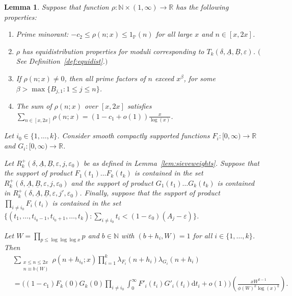 \documentclass{amsart}
\newtheorem{lemma}{Lemma}
\numberwithin{equation}{section}
\begin{document}
 \begin{lemma}\label{lem:asymptotics}  Suppose that function $\rho: \mathbb{N} \times (1,\infty) \rightarrow \mathbb{R}$ has the following properties:
\begin{enumerate}[{\rm(1)}]
\item Prime minorant: $-c_2 \leq \rho(n;x) \leq 1_{\mathbb{P}}(n)$ for all large $x$ and $n \in [x,2x]$.  
\item  $\rho$ has  equidistribution properties for  moduli corresponding to $T_k(\delta,\underline{A},\underline{B},\varepsilon)$. $($See Definition~\ref{def:equidist}.$)$
\item If $\rho(n;x) \neq 0$, then all prime factors of $n$ exceed $x^\beta$, for some $\beta > \max\{ B_{j,1}: 1\leq j \leq n \}$.  
\item The sum of $\rho(n;x)$ over $[x,2x]$ satisfies
$\sum_{n \in [x,2x]} \rho(n;x) = (1-c_1 +o(1)) \frac{x}{\log(x)}$.
\end{enumerate}
 Let $i_0 \in \{1, \dots, k\}$.  Consider   smooth compactly supported functions $F_{i}: [0,\infty) \rightarrow \mathbb{R}$ and $G_{i}: [0,\infty) \rightarrow \mathbb{R}$. 

Let $R_k^+(\delta,\underline{A},\underline{B},\varepsilon,j,\varepsilon_0)$ be as defined in Lemma~\ref{lem:sieveweights}. Suppose that   the support of  product $F_{1}(t_1) \dots F_{k}(t_k)$  is contained in the set $  R_k^+(\delta,\underline{A},\underline{B},\varepsilon,j,\varepsilon_0)$ and the support of   product $G_{1}(t_1) \dots G_{k}(t_k)$ is  contained in   $  R_k^+(\delta,\underline{A},\underline{B},\varepsilon,j',\varepsilon_0)$. 
Finally, suppose that the   support of  product $\prod_{i\neq i_0} F_{i}(t_i) $ is contained in the set $\{(t_1, \dots, t_{i_0-1},t_{i_0+1}, \dots, t_k): \sum_{i \neq i_0} t_i < (1-\varepsilon_0)(A_j-\varepsilon)\}$.  

\smallskip

Let $W= \prod_{p \leq \log\log\log x} p$ and   $b \in \mathbb{N}$ with  $(b+h_i,W)=1$ for all $i \in \{1,\dots,k\}$.   Then
\begin{align*}
&\sum_{\substack{x \leq n \leq 2x \\ n \equiv b (W)}}  \rho(n+h_{i_0}; x) \prod_{i =1}^k \lambda_{F_i}(n+h_i) \lambda_{G_i}(n+h_i) \\ &= \Bigg((1-c_1)  F_{k}(0) G_{k}(0) \prod_{i \neq i_0} \int_0^\infty F'_i(t_i)G'_i(t_i) \mbox{d}t_i+o(1)\Bigg)  \left( \frac{ xW^{k-1}}{\phi(W)^{k} \log(x)^{k}}\right).
\end{align*} \end{lemma}
 
\end{document}
